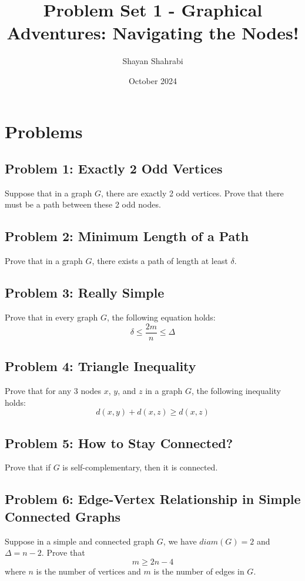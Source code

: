 \documentclass{article}
\title{Problem Set 1 - Graphical Adventures: Navigating the Nodes!}
\author{Shayan Shahrabi}
\date{October 2024}
\begin{document}
\maketitle

\section*{Problems}

\subsection*{Problem 1: Exactly 2 Odd Vertices}
Suppose that in a graph $G$, there are exactly 2 odd vertices. Prove that there must be a path between these 2 odd nodes.

\subsection*{Problem 2: Minimum Length of a Path}
Prove that in a graph $G$, there exists a path of length at least $\delta$.

\subsection*{Problem 3: Really Simple}
Prove that in every graph $G$, the following equation holds:
\begin{equation*}
\delta \le \frac{2m}{n} \le \Delta
\end{equation*}

\subsection*{Problem 4: Triangle Inequality}
Prove that for any 3 nodes $x$, $y$, and $z$ in a graph $G$, the following inequality holds:
\begin{equation*}
d(x,y) + d(x,z) \ge d(x,z)
\end{equation*}

\subsection*{Problem 5: How to Stay Connected?}
Prove that if $G$ is self-complementary, then it is connected.

\subsection*{Problem 6: Edge-Vertex Relationship in Simple Connected Graphs}
Suppose in a simple and connected graph $G$, we have $diam(G) = 2$ and $\Delta = n - 2$. Prove that
\begin{equation*}
m \ge 2n - 4
\end{equation*}
where $n$ is the number of vertices and $m$ is the number of edges in $G$.
\end{document}
